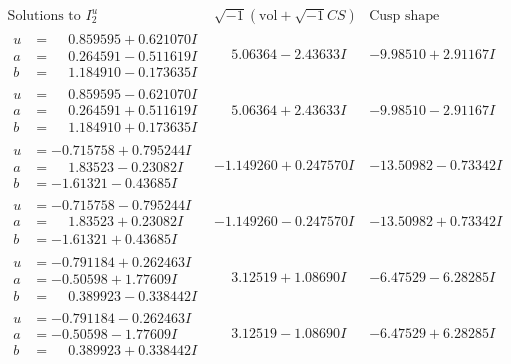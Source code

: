 \documentclass[1p]{elsarticle_modified}
\theoremstyle{definition}
\newcommand{\I}{\sqrt{-1}}
\begin{document}
$$\begin{array}{c|c|c}  
\text{Solutions to }I^u_{2}& \I (\text{vol} + \sqrt{-1}CS) & \text{Cusp shape}\\
 \hline 
\begin{aligned}
u &= \phantom{-}0.859595 + 0.621070 I \\
a &= \phantom{-}0.264591 - 0.511619 I \\
b &= \phantom{-}1.184910 - 0.173635 I\end{aligned}
 & \phantom{-}5.06364 - 2.43633 I & -9.98510 + 2.91167 I \\ \hline\begin{aligned}
u &= \phantom{-}0.859595 - 0.621070 I \\
a &= \phantom{-}0.264591 + 0.511619 I \\
b &= \phantom{-}1.184910 + 0.173635 I\end{aligned}
 & \phantom{-}5.06364 + 2.43633 I & -9.98510 - 2.91167 I \\ \hline\begin{aligned}
u &= -0.715758 + 0.795244 I \\
a &= \phantom{-}1.83523 - 0.23082 I \\
b &= -1.61321 - 0.43685 I\end{aligned}
 & -1.149260 + 0.247570 I & -13.50982 - 0.73342 I \\ \hline\begin{aligned}
u &= -0.715758 - 0.795244 I \\
a &= \phantom{-}1.83523 + 0.23082 I \\
b &= -1.61321 + 0.43685 I\end{aligned}
 & -1.149260 - 0.247570 I & -13.50982 + 0.73342 I \\ \hline\begin{aligned}
u &= -0.791184 + 0.262463 I \\
a &= -0.50598 + 1.77609 I \\
b &= \phantom{-}0.389923 - 0.338442 I\end{aligned}
 & \phantom{-}3.12519 + 1.08690 I & -6.47529 - 6.28285 I \\ \hline\begin{aligned}
u &= -0.791184 - 0.262463 I \\
a &= -0.50598 - 1.77609 I \\
b &= \phantom{-}0.389923 + 0.338442 I\end{aligned}
 & \phantom{-}3.12519 - 1.08690 I & -6.47529 + 6.28285 I \\ \hline\begin{aligned}

\end{aligned}
\end{array}$$
\end{document}
